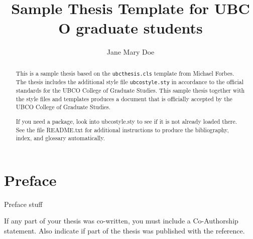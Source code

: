 \documentclass[msc,oneside]{ubcthesis}%
\title{Sample Thesis Template for UBC O graduate students}
\author{Jane Mary Doe} %
\begin{document}
\frontmatter                    %

\maketitle                      %

\begin{abstract}                %
This is a sample thesis based on the \texttt{ubcthesis.cls} template
from Michael Forbes. The thesis includes the additional style file
\texttt{ubcostyle.sty} in accordance to the official standards for
the UBCO College of Graduate Studies.
This sample thesis together with the style files and templates
produces a document that is officially accepted by the UBCO College of Graduate Studies. 

If you need a package, look into ubcostyle.sty to see if it is not already loaded there. 
See the file README.txt for additional instructions to produce the bibliography, index, and glossary 
automatically.
\end{abstract}

\chapter{Preface}
Preface stuff

If any part of your thesis was co-written, you must include a
Co-Author\-ship statement. Also indicate if part of the thesis was published with the reference.

\newpage
{} \label{tableofcontent}%
\tableofcontents                %
\newpage 
{} \label{listoftab}%
\listoftables                   %
\newpage
{} \label{listoffig}%
\listoffigures                  %
\end{document}
